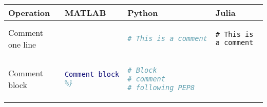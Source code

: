 \begin{tabular}[]{@{}llll@{}}
\toprule
\begin{minipage}[b]{0.19\columnwidth}\raggedright
Operation
\end{minipage} & \begin{minipage}[b]{0.22\columnwidth}\raggedright
MATLAB
\end{minipage} & \begin{minipage}[b]{0.22\columnwidth}\raggedright
Python
\end{minipage} & \begin{minipage}[b]{0.25\columnwidth}\raggedright
Julia
\end{minipage}\tabularnewline
\midrule
\begin{minipage}[t]{0.19\columnwidth}\raggedright
Comment one line
\end{minipage} & \begin{minipage}[t]{0.22\columnwidth}\raggedright
\begin{lstlisting}[language=Matlab]
% This is a comment
\end{lstlisting}

\end{minipage} & \begin{minipage}[t]{0.22\columnwidth}\raggedright
\begin{lstlisting}[language=Python]
# This is a comment
\end{lstlisting}

\end{minipage} & \begin{minipage}[t]{0.25\columnwidth}\raggedright
\begin{lstlisting}
# This is a comment
\end{lstlisting}

\end{minipage}\tabularnewline
\begin{minipage}[t]{0.19\columnwidth}\raggedright
Comment block
\end{minipage} & \begin{minipage}[t]{0.22\columnwidth}\raggedright
\begin{lstlisting}[language=Matlab]
%{
Comment block
%}
\end{lstlisting}

\end{minipage} & \begin{minipage}[t]{0.22\columnwidth}\raggedright
\begin{lstlisting}[language=Python]
# Block
# comment
# following PEP8
\end{lstlisting}


\end{minipage}
\end{tabular}
